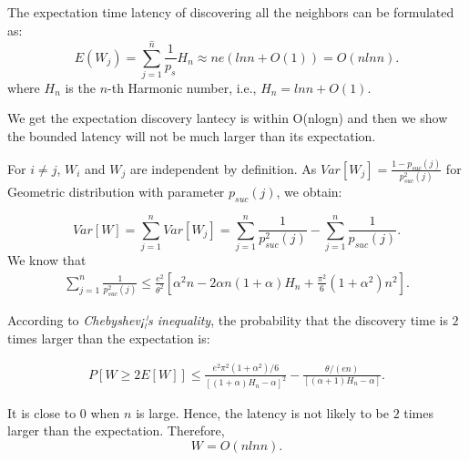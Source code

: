 The expectation time latency of discovering all the neighbors can be formulated as:
$$
E(W_j) = \sum_{j=1}^{\hat{n}}\frac{1}{p_s}H_n \approx ne(lnn + O(1)) = O(nlnn).
$$
where $H_n$ is the $n$-th Harmonic number, i.e.,
$H_n = lnn + O(1)$.

We get the expectation discovery lantecy is within O(nlogn) and then we
show the bounded latency will not be much larger than its expectation.

For $i\neq j$, $W_i$ and $W_j$ are independent by definition. As $Var[W_j]=\frac{1-p_{suc}(j)}{p^2_{suc}(j)}$ for Geometric distribution with parameter $p_{suc}(j)$, we obtain:

\begin{displaymath}
Var[W]=\sum_{j=1}^{n}Var[W_j]=\sum_{j=1}^{n}\frac{1}{p^2_{suc}(j)}-\sum_{j=1}^{n}\frac{1}{p_{suc}(j)}.
\end{displaymath}
We know that
\begin{displaymath}
\begin{split}
\sum_{j=1}^{n}\frac{1}{p^2_{suc}(j)}%
 \leq\frac{e^2}{\theta^2}[ \alpha^2n-2\alpha n(1+\alpha)H_n
+\frac{\pi^2}{6}(1+\alpha^2)n^2].
\end{split}
\end{displaymath}

According to \emph{Chebyshev¡¦s inequality}, the probability that the discovery time is $2$ times larger than the expectation is:

\begin{displaymath}
\begin{split}
 P[W\ge2E[W]]%
 \leq\frac{e^2\pi^2(1+\alpha^2)/6}{[(1+\alpha)H_n-\alpha]^2}-\frac{\theta/(en)}{[(\alpha+1)H_n-\alpha]}.
\end{split}
\end{displaymath}

It is close to $0$ when $n$ is large. Hence, the latency is not likely to be $2$ times larger than the expectation. Therefore,
\begin{equation}
W=O(nlnn).
\end{equation}

